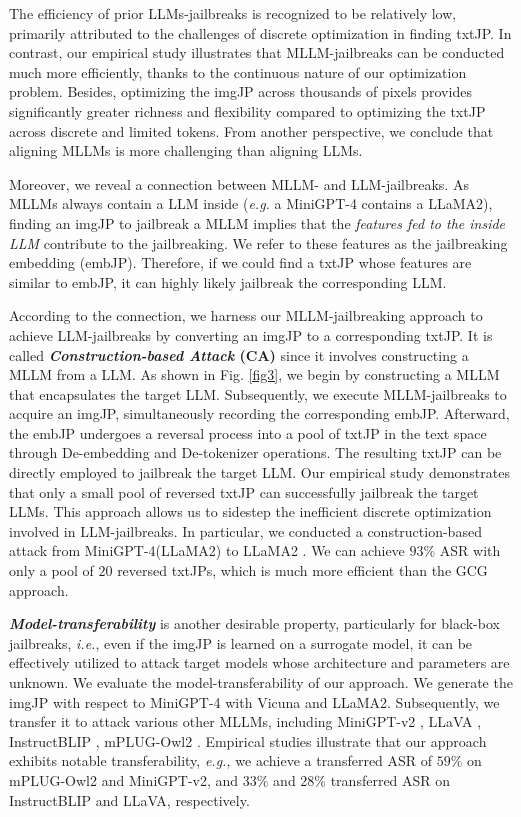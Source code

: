 The efficiency of prior LLMs-jailbreaks is recognized to be relatively low, primarily attributed to the challenges of discrete optimization in finding txtJP. In contrast, our empirical study illustrates that MLLM-jailbreaks can be conducted much more efficiently, thanks to the continuous nature of our optimization problem. Besides, optimizing the imgJP across thousands of pixels provides significantly greater richness and flexibility compared to optimizing the txtJP across discrete and limited tokens. From another perspective, we conclude that aligning MLLMs is more challenging than aligning LLMs. %

Moreover, we reveal a connection between MLLM- and LLM-jailbreaks. As MLLMs always contain a LLM inside (\emph{e.g.} a MiniGPT-4 contains a LLaMA2), 
finding an imgJP to jailbreak a MLLM implies that the \emph{features fed to the inside LLM} contribute to the jailbreaking. We refer to these features as the jailbreaking embedding (embJP). Therefore, if we could find a txtJP whose features are similar to embJP, it can highly likely jailbreak the corresponding LLM. 

According to the connection, we harness our MLLM-jailbreaking approach to achieve LLM-jailbreaks by converting an imgJP to a corresponding txtJP. It is called \textbf{\emph{Construction-based Attack} (CA)} since it involves constructing a MLLM from a LLM. As shown in Fig. \ref{fig3}, we begin by constructing a MLLM that encapsulates the target LLM. Subsequently, we execute MLLM-jailbreaks to acquire an imgJP, simultaneously recording the corresponding embJP. Afterward, the embJP undergoes a reversal process into a pool of txtJP in the text space through De-embedding and De-tokenizer operations. The resulting txtJP can be directly employed to jailbreak the target LLM. Our empirical study demonstrates that only a small pool of reversed txtJP can successfully jailbreak the target LLMs. This approach allows us to sidestep the inefficient discrete optimization involved in LLM-jailbreaks. In particular, we conducted a construction-based attack from MiniGPT-4(LLaMA2) to LLaMA2 \cite{touvron2023llama}. We can achieve $93\%$ ASR with only a pool of $20$ reversed txtJPs, which is much more efficient than the GCG \cite{zou2023universal} approach. 

\emph{\textbf{Model-transferability}} is another desirable property, particularly for black-box jailbreaks, \emph{i.e.}, even if the imgJP is learned on a surrogate model, it can be effectively utilized to attack target models whose architecture and parameters are unknown. We evaluate the model-transferability of our approach. We generate the imgJP with respect to MiniGPT-4 \cite{zhu2023minigpt} with Vicuna \cite{zheng2023judging} and LLaMA2. Subsequently, we transfer it to attack various other MLLMs, including MiniGPT-v2 \cite{chen2023minigpt}, LLaVA \cite{liu2023visual}, InstructBLIP \cite{instructblip}, mPLUG-Owl2 \cite{ye2023mplug}. Empirical studies illustrate that our approach exhibits notable transferability, \emph{e.g.,} we achieve a transferred ASR of $59\%$ on mPLUG-Owl2 and MiniGPT-v2, and $33\%$ and $28\%$ transferred ASR on InstructBLIP and LLaVA, respectively. %

